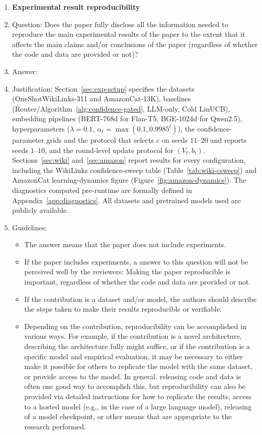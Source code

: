 \documentclass{article}
\theoremstyle{definition}
\theoremstyle{remark}
\theoremstyle{remark}
\begin{document}
\begin{enumerate}
    \item {\bf Experimental result reproducibility}
    \item[] Question: Does the paper fully disclose all the information needed to reproduce the main experimental results of the paper to the extent that it affects the main claims and/or conclusions of the paper (regardless of whether the code and data are provided or not)?
    \item[] Answer: \answerYes{} %
    \item[] Justification: Section~\ref{sec:exp-setup} specifies the datasets (OneShotWikiLinks-311 and AmazonCat-13K), baselines (Router/Algorithm~\ref{alg:confidence-gated}, LLM-only, Cold LinUCB), embedding pipelines (BERT-768d for Flan-T5, BGE-1024d for Qwen2.5), hyperparameters ($\lambda=0.1$, $\alpha_t=\max(0.1, 0.9985^t)$), the confidence-parameter grids and the protocol that selects $c$ on seeds $11$--$20$ and reports seeds $1$--$10$, and the round-level update protocol for $(V_t,b_t)$. Sections~\ref{sec:wiki} and~\ref{sec:amazon} report results for every configuration, including the WikiLinks confidence-sweep table (Table~\ref{tab:wiki-csweep}) and AmazonCat learning-dynamics figure (Figure~\ref{fig:amazon-dynamics}). The diagnostics computed pre-runtime are formally defined in Appendix~\ref{app:diagnostics}. All datasets and pretrained models used are publicly available.
    \item[] Guidelines:
    \begin{itemize}
        \item The answer \answerNA{} means that the paper does not include experiments.
        \item If the paper includes experiments, a \answerNo{} answer to this question will not be perceived well by the reviewers: Making the paper reproducible is important, regardless of whether the code and data are provided or not.
        \item If the contribution is a dataset and\slash or model, the authors should describe the steps taken to make their results reproducible or verifiable. 
        \item Depending on the contribution, reproducibility can be accomplished in various ways. For example, if the contribution is a novel architecture, describing the architecture fully might suffice, or if the contribution is a specific model and empirical evaluation, it may be necessary to either make it possible for others to replicate the model with the same dataset, or provide access to the model. In general. releasing code and data is often one good way to accomplish this, but reproducibility can also be provided via detailed instructions for how to replicate the results, access to a hosted model (e.g., in the case of a large language model), releasing of a model checkpoint, or other means that are appropriate to the research performed.

\end{itemize}
\end{enumerate}
\end{document}
